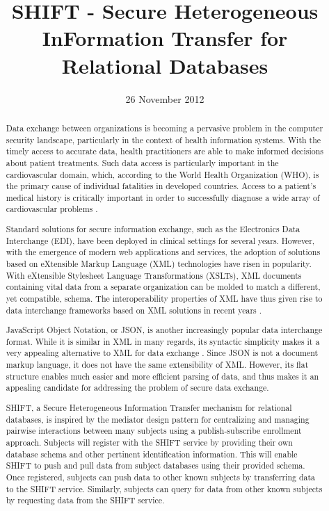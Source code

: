 \documentclass{sig-alternate}
\begin{document}
\title{SHIFT - Secure Heterogeneous InFormation Transfer for Relational Databases}
\author{
}
\date{26 November 2012}
\maketitle
\begin{abstract}

Data exchange between organizations is becoming a pervasive problem in the computer
security landscape, particularly in the context of health information systems. With the 
timely access to accurate data, health practitioners are able to make informed decisions
about patient treatments. Such data access is particularly important in the cardiovascular domain,
which, according to the World Health Organization (WHO), is the primary cause of 
individual fatalities in developed countries. Access to a patient's medical history 
is critically important in order to successfully diagnose a wide array of 
cardiovascular problems \cite{Fayn2010-PersonalHealth}.

Standard solutions for secure information exchange, such as the Electronics Data Interchange (EDI),
have been deployed in clinical settings for several years. However, with the emergence of modern
web applications and services, the adoption of solutions based on eXtensible Markup Language (XML)
technologies have risen in popularity. With eXtensible Stylesheet Language Transformations (XSLTs), 
XML documents containing vital data from a separate organization can be molded to match a different, yet 
compatible, schema. The interoperability properties of XML have thus given rise to data interchange frameworks
based on XML solutions in recent years \cite{Jumaa10-XmlExchange}.

JavaScript Object Notation, or JSON, is another increasingly popular data interchange format. While it is
similar in XML in many regards, its syntactic simplicity makes it a very appealing alternative to XML for
data exchange \cite{Crockford2006-JSON}. Since JSON is not a document markup language, it does not have the
same extensibility of  XML. However, its flat structure enables much easier and more efficient parsing of 
data, and thus makes it an appealing candidate for addressing the problem of secure data exchange.

SHIFT, a Secure Heterogeneous Information Transfer mechanism for relational databases, is inspired 
by the mediator design pattern for centralizing and managing pairwise interactions between many 
subjects using a publish-subscribe enrollment approach. Subjects will register with the SHIFT service
by providing their own database schema and other pertinent identification information. This will enable
SHIFT to push and pull data from subject databases using their provided schema. Once registered,
subjects can push data to other known subjects by transferring data to the SHIFT service. Similarly,
subjects can query for data from other known subjects by requesting data from the SHIFT service. 


\end{abstract}
\end{document}

